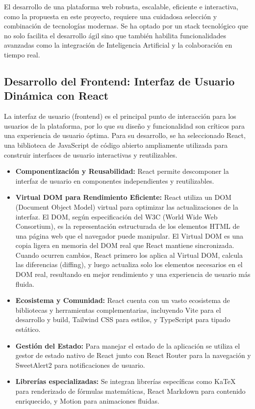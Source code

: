\documentclass[12pt,a4paper]{report}
\begin{document}
El desarrollo de una plataforma web robusta, escalable, eficiente e interactiva, como la propuesta en este proyecto, requiere una cuidadosa selección y combinación de tecnologías modernas. Se ha optado por un stack tecnológico que no solo facilita el desarrollo ágil sino que también habilita funcionalidades avanzadas como la integración de Inteligencia Artificial y la colaboración en tiempo real.

\subsection{Desarrollo del Frontend: Interfaz de Usuario Dinámica con React}

La interfaz de usuario (frontend) es el principal punto de interacción para los usuarios de la plataforma, por lo que su diseño y funcionalidad son críticos para una experiencia de usuario óptima. Para su desarrollo, se ha seleccionado React, una biblioteca de JavaScript de código abierto ampliamente utilizada para construir interfaces de usuario interactivas y reutilizables.

\begin{itemize}
\item \textbf{Componentización y Reusabilidad:} React permite descomponer la interfaz de usuario en componentes independientes y reutilizables.

\item \textbf{Virtual DOM para Rendimiento Eficiente:} React utiliza un DOM (Document Object Model) virtual para optimizar las actualizaciones de la interfaz. El DOM, según especificación del W3C (World Wide Web Consortium), es la representación estructurada de los elementos HTML de una página web que el navegador puede manipular. El Virtual DOM es una copia ligera en memoria del DOM real que React mantiene sincronizada. Cuando ocurren cambios, React primero los aplica al Virtual DOM, calcula las diferencias (diffing), y luego actualiza solo los elementos necesarios en el DOM real, resultando en mejor rendimiento y una experiencia de usuario más fluida.

\item \textbf{Ecosistema y Comunidad:} React cuenta con un vasto ecosistema de bibliotecas y herramientas complementarias, incluyendo Vite para el desarrollo y build, Tailwind CSS para estilos, y TypeScript para tipado estático.

\item \textbf{Gestión del Estado:} Para manejar el estado de la aplicación se utiliza el gestor de estado nativo de React junto con React Router para la navegación y SweetAlert2 para notificaciones de usuario.

\item \textbf{Librerías especializadas:} Se integran librerías específicas como KaTeX para renderizado de fórmulas matemáticas, React Markdown para contenido enriquecido, y Motion para animaciones fluidas.
\end{itemize}
\end{document}
